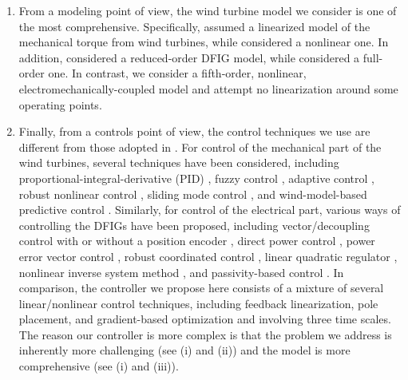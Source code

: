 \documentclass[journal]{IEEEtran}
\begin{document}
\begin{enumerate}
\item From a modeling point of view, the wind turbine model we consider is one of the most comprehensive. Specifically, \cite{Malinga03,Hand99,ZhangL08} assumed a linearized model of the mechanical torque from wind turbines, while \cite{Iyasere08,Prats00,Johnson04b,Johnson06,Beltran08,Calderaro07,Galdi08,Chedid00,GengH09} considered a nonlinear one. In addition, \cite{Ko07,ZhiDW07,Marinescu04,Tarnowski07,WuF08,Pena96,LiDD04,Brekken03,Alegria04,Hopfensperger00,Rabelo01,LiH06,Hansen04} considered a reduced-order DFIG model, while \cite{Peresada04,Monroy08} considered a full-order one. In contrast, we consider a fifth-order, nonlinear, electromechanically-coupled model and attempt no linearization around some operating points.
\item Finally, from a controls point of view, the control techniques we use are different from those adopted in \cite{Prats00,Iyasere08,Johnson04b,Johnson06,Calderaro07,Galdi08,Chedid00,Beltran08,Malinga03,Hand99,ZhangL08,GengH09,Muljadi01,Senjyu06,Stol01,Wright03,Wright03b,ZhangJZ08,Janssens07,Tarnowski07,Ko07,Brekken03,Marinescu04,LiDD04,ZhiDW07,WuF08, Alegria04,Pena96,Hopfensperger00,Monroy08,Peresada04,Hansen04,LiH06,Rabelo01}. For control of the mechanical part of the wind turbines, several techniques have been considered, including proportional-integral-derivative (PID) \cite{Malinga03,Hand99,ZhangL08}, fuzzy control \cite{Chedid00,Prats00,Galdi08,ZhangJZ08,Calderaro07}, adaptive control \cite{Johnson04b,Johnson06}, robust nonlinear control \cite{Iyasere08,GengH09}, sliding mode control \cite{Beltran08}, and wind-model-based predictive control \cite{Senjyu06}. Similarly, for control of the electrical part, various ways of controlling the DFIGs have been proposed, including vector/decoupling control with or without a position encoder \cite{Pena96,Tarnowski07,Ko07,Peresada04,Brekken03,Hopfensperger00,Hansen04,LiH06,Rabelo01}, direct power control \cite{ZhiDW07}, power error vector control \cite{Alegria04}, robust coordinated control \cite{Marinescu04}, linear quadratic regulator \cite{WuF08}, nonlinear inverse system method \cite{LiDD04}, and passivity-based control \cite{Monroy08}. In comparison, the controller we propose here consists of a mixture of several linear/nonlinear control techniques, including feedback linearization, pole placement, and gradient-based optimization and involving three time scales. The reason our controller is more complex is that the problem we address is inherently more challenging (see (i) and (ii)) and the model is more comprehensive (see (i) and (iii)).
\end{enumerate}
\end{document}
